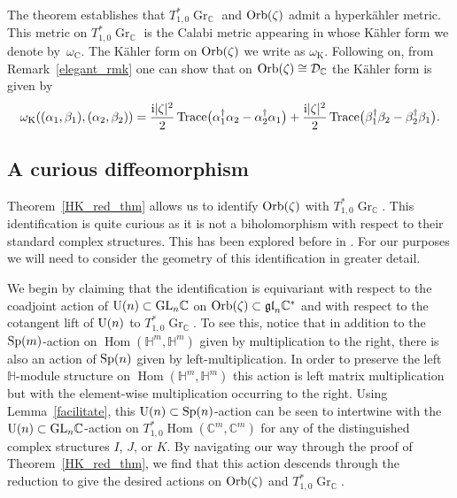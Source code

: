 \documentclass[pdftex]{sigma}
\numberwithin{equation}{section}
\DeclareMathOperator{\Hom}{Hom}
\DeclareMathOperator{\Gr}{Gr}
\DeclareMathOperator{\Tr}{Trace}
\newcommand{\C}{\mathbb{C}}
\newcommand{\D}{\mathcal{D}}
\newcommand{\Q}{\mathbb{H}}
\begin{document}
\begin{Remark}
	The theorem establishes that $T^*_{1,0}\Gr_\C$ and ${\rm Orb}(\zeta)$ admit a hyperk\"{a}hler metric. This metric on $T^*_{1,0}\Gr_\C$ is the Calabi metric appearing in \cite{calabi_metric} whose K\"{a}hler form we denote by~$\omega_\text{C}$. The K\"{a}hler form on ${\rm Orb}(\zeta)$ we write as $\omega_\text{K}$. Following on, from Remark~\ref{elegant_rmk} one can show that on ${\rm Orb}(\zeta)\cong\D_{\C}$ the K\"{a}hler form is given by
	\begin{equation*} \omega_\text{K}((\alpha_1,\beta_1),(\alpha_2,\beta_2))=\frac{{\rm i}|\zeta|^2}{2}\Tr\bigl(\alpha_1^\dagger\alpha_2-\alpha_2^\dagger\alpha_1\bigr)+\frac{{\rm i}|\zeta|^2}{2}\Tr\bigl(\beta_1^\dagger\beta_2-\beta_2^\dagger\beta_1\bigr).
	\end{equation*}
\end{Remark}

\subsection{A curious diffeomorphism}

Theorem~\ref{HK_red_thm} allows us to identify ${\rm Orb}(\zeta)$ with $T^*_{1,0}\Gr_\C$. This identification is quite curious as it is not a biholomorphism with respect to their standard complex structures. This has been explored before in \cite{french}. For our purposes we will need to consider the geometry of this identification in greater detail.

We begin by claiming that the identification is equivariant with respect to the coadjoint action of ${\rm U}(n)\subset {\rm GL}_n\C$ on ${\rm Orb}(\zeta)\subset\mathfrak{gl}_n\C^*$ and with respect to the cotangent lift of ${\rm U}(n)$ to $T^*_{1,0}\Gr_\C$. To see this, notice that in addition to the ${\rm Sp}(m)$-action on $\Hom(\Q^m,\Q^m)$ given by multiplication to the right, there is also an action of ${\rm Sp}(n)$ given by left-multiplication. In order to preserve the left $\Q$-module structure on $\Hom(\Q^m,\Q^m)$ this action is left matrix multiplication but with the element-wise multiplication occurring to the right. Using Lemma~\ref{facilitate}, this ${\rm U}(n)\subset {\rm Sp}(n)$-action can be seen to intertwine with the ${\rm U}(n)\subset {\rm GL}_n\C$-action on $T^*_{1,0}\Hom(\C^m,\C^m)$ for any of the distinguished complex structures $I$, $J$, or $K$. By navigating our way through the proof of Theorem~\ref{HK_red_thm}, we find that this action descends through the reduction to give the desired actions on ${\rm Orb}(\zeta)$ and $T^*_{1,0}\Gr_\C$.
\end{document}
